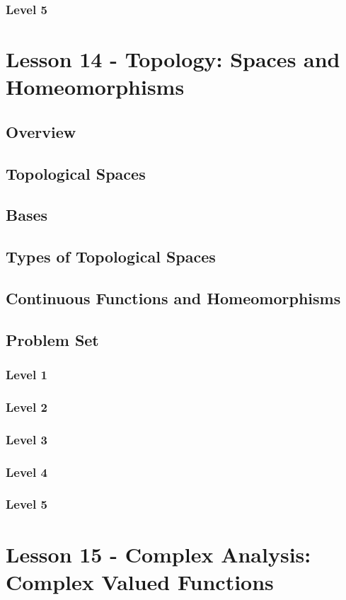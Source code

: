 \documentclass{article}
\begin{document}
\subsubsection{Level 5}
\pagebreak

\section{Lesson 14 - Topology: Spaces and Homeomorphisms}
\subsection{Overview}
\subsection{Topological Spaces}
\subsection{Bases}
\subsection{Types of Topological Spaces}
\subsection{Continuous Functions and Homeomorphisms}
\subsection{Problem Set}
\subsubsection{Level 1}
\subsubsection{Level 2}
\subsubsection{Level 3}
\subsubsection{Level 4}
\subsubsection{Level 5}
\pagebreak

\section{Lesson 15 - Complex Analysis: Complex Valued Functions}
\end{document}
